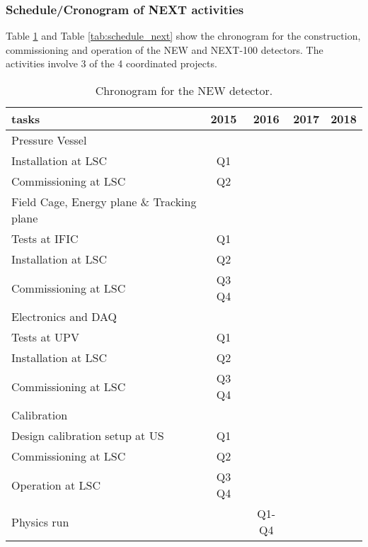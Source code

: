 

\subsubsection*{Schedule/Cronogram of NEXT activities}

Table \ref{tab:schedule_new} and Table \ref{tab:schedule_next} show the chronogram for the construction, commissioning and operation of the NEW and NEXT-100 detectors. The activities involve 3 of the 4 coordinated projects. 

\begin{table}[h!]
\begin{center}
\begin{tabular}{| l | c | c | c | c |}
\hline
tasks & 2015 & 2016 & 2017 & 2018 \\
\hline
Pressure Vessel & & & &   \\
\hline
Installation at LSC & Q1 & & & \\
Commissioning at LSC & Q2 & & & \\
\hline
Field Cage, Energy plane \& Tracking plane & & & &   \\
\hline
Tests at IFIC & Q1 & & & \\
Installation at LSC & Q2 & & & \\
Commissioning at LSC & Q3 Q4 & & & \\
\hline
Electronics and DAQ & & & &   \\
\hline
Tests at UPV & Q1 & & & \\
Installation at LSC & Q2 & & & \\
Commissioning at LSC & Q3 Q4 & & & \\
\hline
Calibration & & & &   \\
\hline
Design calibration setup at US & Q1 & & & \\
Commissioning at LSC & Q2 & & & \\
Operation at LSC & Q3 Q4 & & & \\
\hline
Physics run & & Q1-Q4& &   \\
\hline
\hline
\end{tabular}
\caption{Chronogram for the NEW detector.}
\label{tab:schedule_new}
\end{center}
\end{table} 

